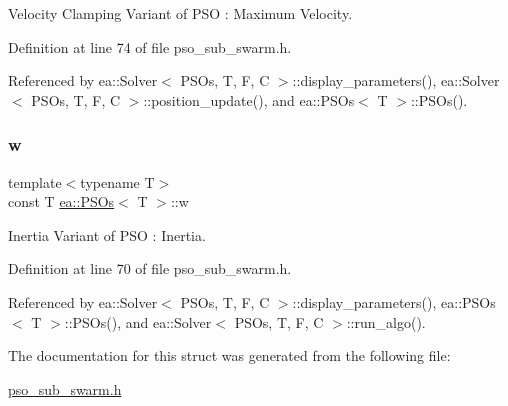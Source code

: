 Velocity Clamping Variant of P\+SO \+: Maximum Velocity. 



Definition at line 74 of file pso\+\_\+sub\+\_\+swarm.\+h.



Referenced by ea\+::\+Solver$<$ P\+S\+Os, T, F, C $>$\+::display\+\_\+parameters(), ea\+::\+Solver$<$ P\+S\+Os, T, F, C $>$\+::position\+\_\+update(), and ea\+::\+P\+S\+Os$<$ T $>$\+::\+P\+S\+Os().

\mbox{\label{structea_1_1_p_s_os_a31794d89fb98ef9f4e887458c0982982}} 
\subsubsection{\texorpdfstring{w}{w}}
{\footnotesize\ttfamily template$<$typename T$>$ \\
const T \hyperlink{structea_1_1_p_s_os}{ea\+::\+P\+S\+Os}$<$ T $>$\+::w}



Inertia Variant of P\+SO \+: Inertia. 



Definition at line 70 of file pso\+\_\+sub\+\_\+swarm.\+h.



Referenced by ea\+::\+Solver$<$ P\+S\+Os, T, F, C $>$\+::display\+\_\+parameters(), ea\+::\+P\+S\+Os$<$ T $>$\+::\+P\+S\+Os(), and ea\+::\+Solver$<$ P\+S\+Os, T, F, C $>$\+::run\+\_\+algo().



The documentation for this struct was generated from the following file\+:\begin{DoxyCompactItemize}
\item 
\hyperlink{pso__sub__swarm_8h}{pso\+\_\+sub\+\_\+swarm.\+h}\end{DoxyCompactItemize}
